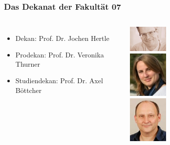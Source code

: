 \documentclass{beamer}
\begin{document}
	\begin{frame} %
		\frametitle{Das Dekanat der Fakultät 07}
			\begin{columns}
                \begin{itemize}
                	\item Dekan: Prof. Dr. Jochen Hertle
                	\bigskip
                	\bigskip
                	\bigskip
                	\item Prodekan: Prof. Dr. Veronika Thurner
                	\bigskip
                	\item Studiendekan: Prof. Dr. Axel Böttcher
                \end{itemize}
                \includegraphics[width=0.3\textwidth]{jochen-hertle.png} \\
                \includegraphics[width=0.3\textwidth]{Prof_Thurner.jpg} \\
                \includegraphics[width=0.3\textwidth]{boettcher.jpg}
			\end{columns}
    \end{frame}
    
\end{document}
